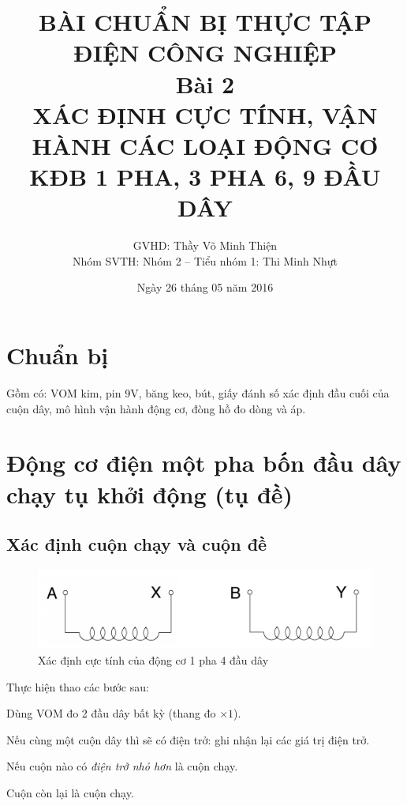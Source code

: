 \documentclass[13pt,a4paper]{extarticle}
\begin{document}
\title{\Large{\textbf{BÀI CHUẨN BỊ THỰC TẬP ĐIỆN CÔNG NGHIỆP}}\\\vspace{1cm}\textbf{Bài 2}\\\vspace{.5cm}\textbf{XÁC ĐỊNH CỰC TÍNH, VẬN HÀNH CÁC LOẠI ĐỘNG CƠ KĐB 1 PHA, 3 PHA 6, 9 ĐẦU DÂY}}
\date{Ngày 26 tháng 05 năm 2016}
\author{GVHD: Thầy Võ Minh Thiện \vspace{.6cm}\\  Nhóm SVTH: Nhóm 2 -- Tiểu nhóm 1: Thi Minh Nhựt}
\maketitle
\tableofcontents
\newpage
{}
\setcounter{page}{1}
\section{Chuẩn bị}
Gồm có: VOM kim, pin 9V, băng keo, bút, giấy đánh số xác định đầu cuối của cuộn dây, mô hình vận hành động cơ, đòng hồ đo dòng và áp.
\section{Động cơ điện một pha bốn đầu dây chạy tụ khởi động (tụ đề)}
\subsection{Xác định cuộn chạy và cuộn đề}
\label{sec:chay-tu-de}
\begin{figure}[!h]
\begin{center}
\includegraphics[scale=.5]{1p-4day}
\end{center}
\caption{Xác định cực tính của động cơ 1 pha 4 đầu dây}
\end{figure}

Thực hiện thao các bước sau:
\begin{list}{--}{}
\item Dùng VOM đo 2 đầu dây bất kỳ (thang đo $\times 1$).
\item Nếu cùng một cuộn dây thì sẽ có điện trở: ghi nhận lại các giá trị điện trở.
\item Nếu cuộn nào có \emph{điện trở nhỏ hơn} là cuộn chạy.
\item Cuộn còn lại là cuộn chạy.
\end{list}
\end{document}
